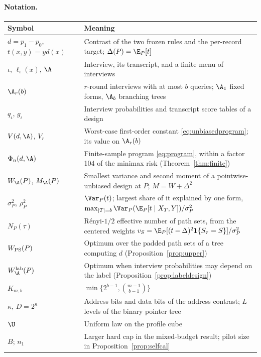 \paragraph{Notation.}
\begin{center}\small
\begin{tabular}{lp{10.5cm}}
\toprule
Symbol & Meaning\\
\midrule
$d=p_1-p_0$, $t(x,y)=yd(x)$ & Contrast of the two frozen rules and the per-record target; $\Delta(P)=\E_P[t]$\\
$\iota$, $\ell_\iota(x)$, $\A$ & Interview, its transcript, and a finite menu of interviews\\
$\A_r(b)$ & $r$-round interviews with at most $b$ queries; $\A_1$ fixed forms, $\A_b$ branching trees\\
$q_\iota$, $g_\iota$ & Interview probabilities and transcript score tables of a design\\
$V(d,\A)$, $V_r$ & Worst-case first-order constant \eqref{eq:unbiasedprogram}; its value on $\A_r(b)$\\
$\Phi_n(d,\A)$ & Finite-sample program \eqref{eq:program}, within a factor 104 of the minimax risk (Theorem~\ref{thm:finite})\\
$W_\A(P)$, $M_\A(P)$ & Smallest variance and second moment of a pointwise-unbiased design at $P$; $M=W+\Delta^2$\\
$\sigma_P^2$, $\rho_P^2$ & $\Var_P(t)$; largest share of it explained by one form, $\max_{|T|=b}\Var_P(\E_P[t\mid X_T,Y])/\sigma_P^2$\\
$N_P(\tau)$ & R\'enyi-$1/2$ effective number of path sets, from the centered weights $v_S=\E_P[(t-\Delta)^2\mathbf 1\{S_\tau=S\}]/\sigma_P^2$\\
$W_{\rm PS}(P)$ & Optimum over the padded path sets of a tree computing $d$ (Proposition~\ref{prop:upper})\\
$W^{\rm lab}_\A(P)$ & Optimum when interview probabilities may depend on the label (Proposition~\ref{prop:labeldesign})\\
$K_{m,b}$ & $\min\{2^{b-1},\binom{m-1}{b-1}\}$\\
$\kappa$, $D=2^\kappa$ & Address bits and data bits of the address contrast; $L$ levels of the binary pointer tree\\
$\U$ & Uniform law on the profile cube\\
$B$; $n_1$ & Larger hard cap in the mixed-budget result; pilot size in Proposition~\ref{prop:selfcal}\\
\bottomrule
\end{tabular}
\end{center}

